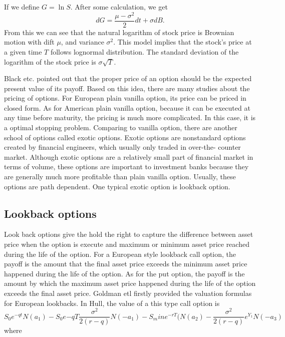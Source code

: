\documentclass[11pt]{book}
\begin{document}
If we define $G = \ln S$. After some calculation, we get 
\begin{equation}\label{eq:2}
dG = \frac{\mu - \sigma ^2 }{2} dt + \sigma dB.
\end{equation}
From this we can see that the natural logarithm of stock price is Brownian motion with dift $\mu$, and variance $\sigma^2$. This model implies that the stock's price at a given time $T$ follows lognormal distribution. The standard deviation of the logarithm of the stock price is $\sigma \sqrt{T}$. 

Black etc. \cite{Black:1973} pointed out that the proper price of an option should be the expected present value of its payoff. Based on this idea, there are many studies about the pricing of options. For European plain vanilla option, its price can be priced in closed form. As for American plain vanilla option, because it can be executed at any time before maturity, the pricing is much more complicated. In this case, it is a optimal stopping problem. Comparing to vanilla option, there are another school of options called exotic options. Exotic options are nonstandard options created by financial engineers, which usually only traded in over-the- counter market. Although exotic options are a relatively small part of financial market in terms of volume, these options are important to investment banks because they are generally much more profitable than plain vanilla option. Usually, these options are path dependent. One typical exotic option is lookback option.


\subsection{Lookback options}
Look back options give the hold the right to capture the difference between asset price when the option is execute and maximum or minimum asset price reached during the life of the option. For a European style lookback call option, the payoff is the amount that the final asset price exceeds the minimum asset price happened during the life of the option. As for the put option, the payoff is the amount by which the maximum asset price happened during the life of the option exceeds the final asset price. Goldman etl firstly provided the valuation formulas for European lookbacks. In Hull, the value of a this type call option is
\begin{equation}\label{eq:3}
S_0e^{-qt}N(a_1) - S_0 e{-qT}\frac{\sigma ^2}{2(r-q)} N(-a_1) - S_min e^{-rT}(N(a_2) - \frac{\sigma^2}{2(r-q)} e ^{Y_1} N(-a_3) 
\end{equation}
where 
\end{document}
